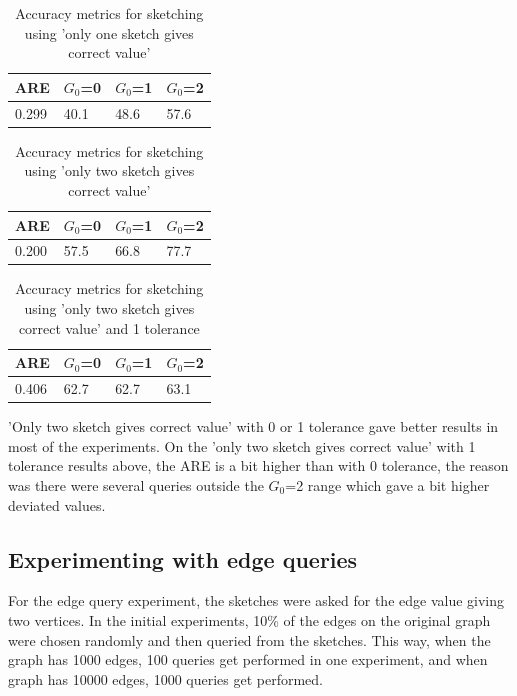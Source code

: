 \documentclass[conference]{IEEEtran}
\begin{document}
\begin{table}[!b]
\caption{Accuracy metrics for sketching using 'only one sketch gives correct value'}
\label{table:Accuracy metrics for sketching using 'only one sketch gives correct value'}
\centering
\begin{tabular}{|l|l|l|l|}
\hline
 ARE   & $G_0$=0 & $G_0$=1 & $G_0$=2 \\ \hline
0.299 &   40.1  &   48.6  &   57.6  \\ \hline
\end{tabular}
\end{table}


\begin{table}[!t]
\caption{Accuracy metrics for sketching using 'only two sketch gives correct value'}
\label{table:Accuracy metrics for sketching using 'only two sketch gives correct value'}
\centering
\begin{tabular}{|l|l|l|l|}
\hline
 ARE   & $G_0$=0 & $G_0$=1 & $G_0$=2 \\ \hline
0.200 &   57.5  &   66.8  &   77.7  \\ \hline
\end{tabular}
\end{table}


\begin{table}[!t]
\caption{Accuracy metrics for sketching using 'only two sketch gives correct value' and 1 tolerance}
\label{table:Accuracy metrics for sketching using 'only two sketch gives correct value' and 1 tolerance}
\centering
\begin{tabular}{|l|l|l|l|}
\hline
 ARE   & $G_0$=0 & $G_0$=1 & $G_0$=2 \\ \hline
0.406 &   62.7  &   62.7  & 63.1    \\ \hline
\end{tabular}
\end{table}

'Only two sketch gives correct value' with 0 or 1 tolerance gave better results in most of the experiments. On the 'only two sketch gives correct value' with 1 tolerance results above, the ARE is a bit higher than with 0 tolerance, the reason was there were several queries outside the  $G_0$=2 range which gave a bit higher deviated values.


\subsection{Experimenting with edge queries}

For the edge query experiment, the sketches were asked for the edge value giving two vertices. In the initial experiments, 10\% of the edges on the original graph were chosen randomly and then queried from the sketches. This way, when the graph has 1000 edges, 100 queries get performed in one experiment, and when graph has 10000 edges, 1000 queries get performed.
\end{document}
